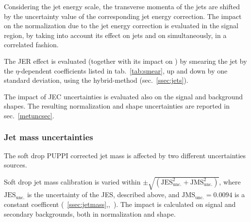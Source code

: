 \noindent Considering the jet energy scale, the transverse momenta of the jets are shifted by the uncertainty value of the corresponding jet energy correction. The impact on the normalization due to the jet energy correction is evaluated in the signal region, by taking into account its effect on jets and on \MET simultaneously, in a correlated fashion.

\noindent The JER effect is evaluated (together with its impact on \MET) by smearing the jet \pt by the $\eta$-dependent coefficients listed in tab.~\ref{tab:smear}, up and down by one standard deviation, using the hybrid-method (sec.~\ref{ssec:jets}).%

\noindent The impact of JEC uncertainties is evaluated also on the signal and background shapes. The resulting normalization and shape uncertainties are reported in sec.~\ref{metuncsec}.%




\subsubsection{Jet mass uncertainties}
\noindent The soft drop PUPPI corrected jet mass is affected by two different uncertainties sources.

\noindent Soft drop jet mass calibration is varied within $\pm \sqrt{ \left( \text{JES}_\text{unc.}^2 + \text{JMS}_\text{unc.}^2 \right) }$, where $\text{JES}_\text{unc.}$ is the uncertainty of the JES, described above, and $\text{JMS}_\text{unc.}=0.0094$ is a constant coefficent (~\ref{ssec:jetmass},\cite{bib:1748-0221-6-11-P11002},~\cite{CMS-DP-2016-020}). The impact is calculated on signal and secondary backgrounds, both in normalization and shape.

